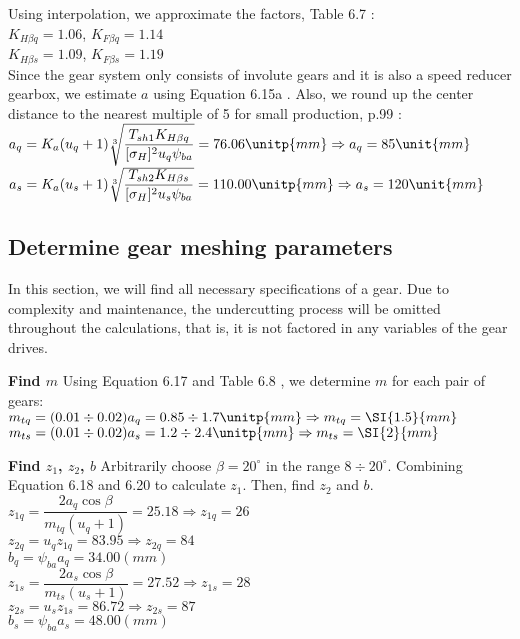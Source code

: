 Using interpolation, we approximate the factors, Table 6.7 \cite{tk1}:\\
$ K_{H\beta q} = 1.06 $, $ K_{F\beta q} = 1.14 $\\
$ K_{H\beta s} = 1.09 $, $ K_{F\beta s} = 1.19 $\\
Since the gear system only consists of involute gears and it is also a speed reducer gearbox, we estimate $ a $ using Equation 6.15a \cite{tk1}. Also, we round up the center distance to the nearest multiple of 5 for small production, p.99 \cite{tk1}:\\
$ a_q = K_a(u_{q}+1)\sqrt[3]{\dfrac{T_{sh1}K_{H\beta q}}{[{\sigma}_H]^2u_{q}\psi_{ba}}} = 76.06 \unitp{mm} \Rightarrow a_{q}= 85 \unit{mm}$\\
$ a_s = K_a(u_{s}+1)\sqrt[3]{\dfrac{T_{sh2}K_{H\beta s}}{[{\sigma}_H]^2u_{s}\psi_{ba}}} = 110.00 \unitp{mm} \Rightarrow a_{s}= 120 \unit{mm}$
\subsection{Determine gear meshing parameters}
In this section, we will find all necessary specifications of a gear. Due to complexity and maintenance, the undercutting process will be omitted throughout the calculations, that is, it is not factored in any variables of the gear drives.

\textbf{Find $ m $} Using Equation 6.17 \cite{tk1} and Table 6.8 \cite{tk1}, we determine $ m $ for each pair of gears:\\
$ m_{tq} = (0.01\div0.02)a_{q} = 0.85 \div 1.7 \unitp{mm} \Rightarrow m_{tq}=\SI{1.5}{mm}$\\
$ m_{ts} = (0.01\div0.02)a_{s} = 1.2 \div 2.4 \unitp{mm} \Rightarrow m_{ts}=\SI{2}{mm}$

\textbf{Find $ z_1 $, $ z_2 $, $ b $} Arbitrarily choose $ \beta = 20^\circ $ in the range $ 8 \div 20^\circ $. Combining Equation 6.18 and 6.20 \cite{tk1} to calculate $ z_1 $. Then, find $ z_2 $ and $ b $.\\
$ z_{1q} = \dfrac{2a_{q}\cos\beta}{m_{tq}(u_q+1)} = 25.18 \Rightarrow z_{1q} = 26$\\
$ z_{2q} = u_{q}z_{1q} = 83.95 \Rightarrow z_{2q} = 84 $\\
$ b_q = \psi_{ba}a_{q} = 34.00\unit{(mm)}$\\
$ z_{1s} = \dfrac{2a_{s}\cos\beta}{m_{ts}(u_s+1)} = 27.52 \Rightarrow z_{1s} = 28$\\
$ z_{2s} = u_{s}z_{1s} = 86.72 \Rightarrow z_{2s} = 87 $\\
$ b_s = \psi_{ba}a_{s} = 48.00\unit{(mm)}$

